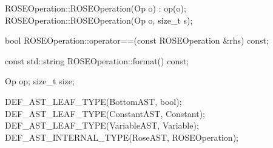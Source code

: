 \begin{apient}
ROSEOperation::ROSEOperation(Op o) : op(o);
ROSEOperation::ROSEOperation(Op o, size_t s);
\end{apient}

\begin{apient}
bool ROSEOperation::operator==(const ROSEOperation &rhs) const;
\end{apient}

\begin{apient}
const std::string ROSEOperation::format() const;
\end{apient}

\begin{apient}
Op op;
size_t size;
\end{apient}


\begin{apient} 
DEF_AST_LEAF_TYPE(BottomAST, bool);
DEF_AST_LEAF_TYPE(ConstantAST, Constant);
DEF_AST_LEAF_TYPE(VariableAST, Variable);
DEF_AST_INTERNAL_TYPE(RoseAST, ROSEOperation);
\end{apient}



